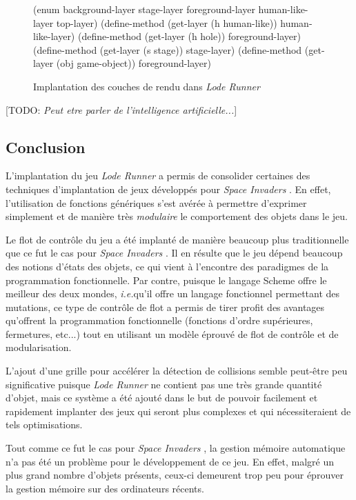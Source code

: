 \documentclass[12pt,oneside,letterpaper,francais]{book}
\newcommand{\todo}[1]{[TODO: {\it #1}]}
\newcommand{\ie}{{\textit{i.e.}}}
\newcommand{\lr}{{\textit{Lode Runner }}}
\newcommand{\si}{{\textit{Space Invaders }}}
\begin{document}
\begin{figure}[htb!]
  \begin{schemecode}
(enum background-layer stage-layer foreground-layer human-like-layer top-layer)
(define-method (get-layer (h human-like))    human-like-layer)
(define-method (get-layer (h hole))          foreground-layer)
(define-method (get-layer (s stage))         stage-layer)
(define-method (get-layer (obj game-object)) foreground-layer)
  \end{schemecode}
  \caption{Implantation des couches de rendu dans \lr}
  \label{Exp:layers}
\end{figure}

\todo{Peut etre parler de l'intelligence artificielle...}

\subsection{Conclusion}

L'implantation du jeu \lr a permis de consolider certaines des
techniques d'implantation de jeux développés pour \si. En effet,
l'utilisation de fonctions génériques s'est avérée à permettre
d'exprimer simplement et de manière très \emph{modulaire} le
comportement des objets dans le jeu. 

Le flot de contrôle du jeu a été implanté de manière beaucoup plus
traditionnelle que ce fut le cas pour \si. Il en résulte que le jeu
dépend beaucoup des notions d'états des objets, ce qui vient à
l'encontre des paradigmes de la programmation fonctionnelle. Par
contre, puisque le langage Scheme offre le meilleur des deux mondes,
\ie qu'il offre un langage fonctionnel permettant des mutations, ce
type de contrôle de flot a permis de tirer profit des avantages
qu'offrent la programmation fonctionnelle (fonctions d'ordre
supérieures, fermetures, etc...) tout en utilisant un modèle éprouvé
de flot de contrôle et de modularisation.

L'ajout d'une grille pour accélérer la détection de collisions semble
peut-être peu significative puisque \lr ne contient pas une très
grande quantité d'objet, mais ce système a été ajouté dans le but de
pouvoir facilement et rapidement implanter des jeux qui seront plus
complexes et qui nécessiteraient de tels optimisations.

Tout comme ce fut le cas pour \si, la gestion mémoire automatique n'a
pas été un problème pour le développement de ce jeu. En effet, malgré
un plus grand nombre d'objets présents, ceux-ci demeurent trop peu
pour éprouver la gestion mémoire sur des ordinateurs récents.
\end{document}
